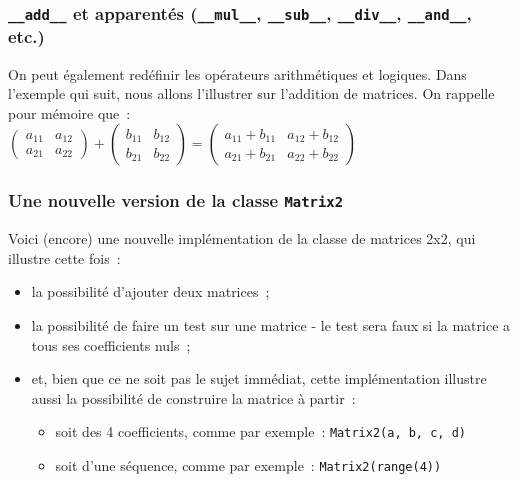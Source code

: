    \hypertarget{add__-et-apparentuxe9s-__mul__-__sub__-__div__-__and__-etc.}{%
\subsubsection{\texorpdfstring{\texttt{\_\_add\_\_} et apparentés
(\texttt{\_\_mul\_\_}, \texttt{\_\_sub\_\_}, \texttt{\_\_div\_\_},
\texttt{\_\_and\_\_},
etc.)}{\_\_add\_\_ et apparentés (\_\_mul\_\_, \_\_sub\_\_, \_\_div\_\_, \_\_and\_\_, etc.)}}\label{add__-et-apparentuxe9s-__mul__-__sub__-__div__-__and__-etc.}}

    On peut également redéfinir les opérateurs arithmétiques et logiques.
Dans l'exemple qui suit, nous allons l'illustrer sur l'addition de
matrices. On rappelle pour mémoire que~:\\

\(\left( \begin{array}{cc} a_{11} & a_{12} \\ a_{21} & a_{22}\end{array} \right) + \left( \begin{array}{cc} b_{11} & b_{12} \\ b_{21} & b_{22}\end{array} \right) = \left( \begin{array}{cc} a_{11}+b_{11} & a_{12}+b_{12} \\ a_{21}+b_{21} & a_{22}+b_{22}\end{array} \right)\)

    \hypertarget{une-nouvelle-version-de-la-classe-matrix2}{%
\subsubsection{\texorpdfstring{Une nouvelle version de la classe
\texttt{Matrix2}}{Une nouvelle version de la classe Matrix2}}\label{une-nouvelle-version-de-la-classe-matrix2}}

    Voici (encore) une nouvelle implémentation de la classe de matrices 2x2,
qui illustre cette fois~:

\begin{itemize}
\tightlist
\item
  la possibilité d'ajouter deux matrices~;
\item
  la possibilité de faire un test sur une matrice - le test sera faux si
  la matrice a tous ses coefficients nuls~;
\item
  et, bien que ce ne soit pas le sujet immédiat, cette implémentation
  illustre aussi la possibilité de construire la matrice à partir~:

  \begin{itemize}
  \tightlist
  \item
    soit des 4 coefficients, comme par exemple~:
    \texttt{Matrix2(a,\ b,\ c,\ d)}
  \item
    soit d'une séquence, comme par exemple~: \texttt{Matrix2(range(4))}
  \end{itemize}
\end{itemize}

